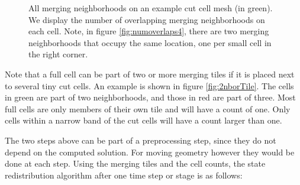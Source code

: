 \begin{itemize}
\begin{figure}
	\caption{\sf All merging neighborhoods on an example cut cell mesh (in green).  We display the number of overlapping merging neighborhoods on each cell. Note, in figure \ref{fig:numoverlaps4}, there are two merging neighborhoods that occupy the same location, one per small cell in the right corner.} \label{fig:overlappingneighs}
\end{figure}
Note that a full cell
can be part of two or more merging tiles if it is placed next to 
several tiny cut cells. An example is shown in
figure \ref{fig:2nborTile}. The cells in green are part of two
neighborhoods, and those in red are part of three.   
 Most full
cells are only members of their own tile and will have a count of one.
Only cells within a narrow band of the cut cells will have a count
larger than one.


\end{itemize}




The two steps above can be part of a preprocessing step, since they do not
depend on the computed solution. For moving geometry however they would
be done at each step.
Using the merging tiles and the cell counts, the state redistribution
algorithm after one time step or stage is as follows:

